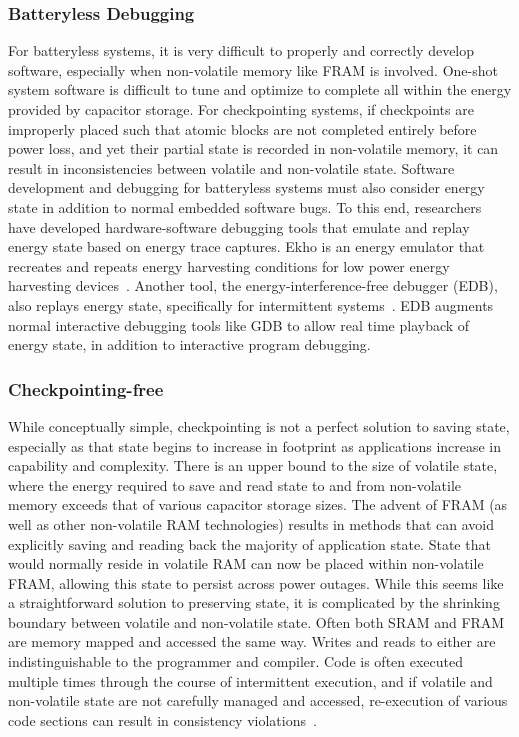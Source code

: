 \subsubsection{Batteryless Debugging}
For batteryless systems, it
is very difficult to properly and correctly develop software, especially when non-volatile memory like FRAM is involved.
One-shot system software is difficult to tune and optimize to complete all within the energy provided by capacitor storage.
For checkpointing systems, if checkpoints are improperly placed such that atomic blocks are not completed entirely before power loss, and yet their partial state is recorded in non-volatile memory,
it can result in inconsistencies between volatile and non-volatile state. 
Software development and debugging for batteryless systems must also consider energy state in addition to normal embedded software bugs.
To this end, researchers have developed hardware-software debugging tools that emulate and replay energy state based on energy trace captures.
Ekho is an energy emulator that recreates and repeats energy harvesting conditions for low power energy harvesting devices~\cite{hester2014ekho}.
Another tool, the energy-interference-free debugger (EDB), also replays energy state, specifically for intermittent systems~\cite{colin2016energy}.
EDB augments normal interactive debugging tools like GDB to allow real time playback of energy state, in addition to interactive program debugging.

\subsubsection{Checkpointing-free}
While conceptually simple, checkpointing is not a perfect solution to saving state, especially as that state begins to increase in footprint as applications increase in capability and complexity. There is an upper bound to the size of volatile state, where the energy required to save and read state to and from non-volatile memory exceeds that of various capacitor storage sizes.
The advent of FRAM (as well as other non-volatile RAM technologies) results in methods that can avoid explicitly saving and reading back the majority of application state. State that would normally reside in volatile RAM can now be placed within non-volatile FRAM, allowing this state to persist across power outages. 
While this seems like a straightforward solution to preserving state, it is complicated by the shrinking
boundary between volatile and non-volatile state. Often both SRAM and FRAM are memory mapped and accessed the same way. Writes and reads to either are indistinguishable to the programmer and compiler.  
Code is often executed multiple times through the course of intermittent execution, and if volatile and non-volatile state are not carefully managed and accessed, re-execution of various code sections can result in consistency violations~\cite{maeng2017alpaca}.


